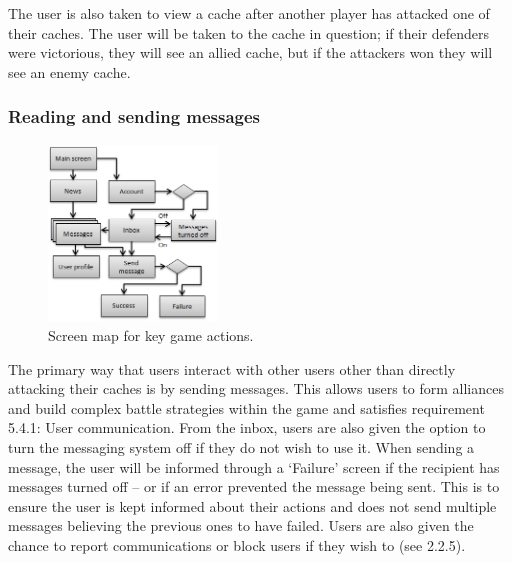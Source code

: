The user is also taken to view a cache after another player has attacked one of their caches. The user will be taken to the cache in question; if their defenders were victorious, they will see an allied cache, but if the attackers won they will see an enemy cache.

\subsubsection{Reading and sending messages}
\begin{figure}
	\vspace{-75pt}
	\begin{center}
	\includegraphics[width=0.4\textwidth]{images/sending_messages}
	\caption{Screen map for key game actions.}
	\label{sending_messages}
	\end{center}
\end{figure}
The primary way that users interact with other users other than directly attacking their caches is by sending messages. This allows users to form alliances and build complex battle strategies within the game and satisfies requirement 5.4.1: User communication. From the inbox, users are also given the option to turn the messaging system off if they do not wish to use it. When sending a message, the user will be informed through a ‘Failure’ screen if the recipient has messages turned off – or if an error prevented the message being sent. This is to ensure the user is kept informed about their actions and does not send multiple messages believing the previous ones to have failed. Users are also given the chance to report communications or block users if they wish to (see 2.2.5).

